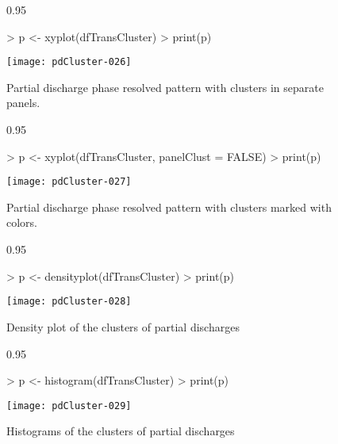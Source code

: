 \documentclass{article}
\renewenvironment{Schunk}{\begin{center}
    \scriptsize
    \begin{boxedminipage}{0.95\textwidth}}{
    \end{boxedminipage}\end{center}}
\begin{document}
\begin{figure}
  \centering
\begin{Schunk}
\begin{Sinput}
> p <- xyplot(dfTransCluster)
> print(p)
\end{Sinput}
\end{Schunk}
\texttt{[image: pdCluster-026]}
  \caption{Partial discharge phase resolved pattern with clusters in
    separate panels.}
  \label{fig:xyplotClusterSeparate}
\end{figure}

\begin{figure}
  \centering
\begin{Schunk}
\begin{Sinput}
> p <- xyplot(dfTransCluster, panelClust = FALSE)
> print(p)
\end{Sinput}
\end{Schunk}
\texttt{[image: pdCluster-027]}
  \caption{Partial discharge phase resolved pattern with clusters
    marked with colors.}
  \label{fig:xyplotCluster}
\end{figure}

\begin{figure}
  \centering
\begin{Schunk}
\begin{Sinput}
> p <- densityplot(dfTransCluster)
> print(p)
\end{Sinput}
\end{Schunk}
\texttt{[image: pdCluster-028]}
  \caption{Density plot of the clusters of partial discharges}
  \label{fig:densityCluster}
\end{figure}

\begin{figure}
  \centering
\begin{Schunk}
\begin{Sinput}
> p <- histogram(dfTransCluster)
> print(p)
\end{Sinput}
\end{Schunk}
\texttt{[image: pdCluster-029]}
  \caption{Histograms of the clusters of partial discharges}
  \label{fig:histogramsCluster}
\end{figure}



\end{document}
